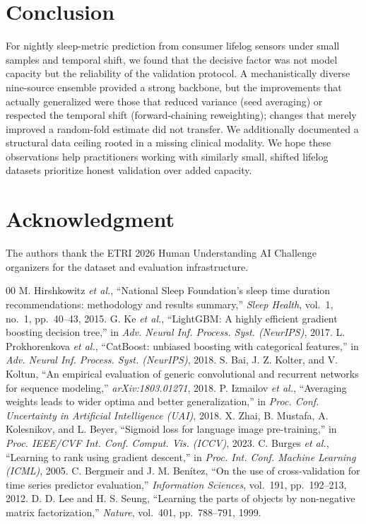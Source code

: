 \documentclass[conference]{IEEEtran}
\begin{document}
\section{Conclusion}
\label{sec:conc}
For nightly sleep-metric prediction from consumer lifelog sensors under small samples
and temporal shift, we found that the decisive factor was not model capacity but the
reliability of the validation protocol. A mechanistically diverse nine-source ensemble
provided a strong backbone, but the improvements that actually generalized were those
that reduced variance (seed averaging) or respected the temporal shift
(forward-chaining reweighting); changes that merely improved a random-fold estimate
did not transfer. We additionally documented a structural data ceiling rooted in a
missing clinical modality. We hope these observations help practitioners working with
similarly small, shifted lifelog datasets prioritize honest validation over added
capacity.

\section*{Acknowledgment}
The authors thank the ETRI 2026 Human Understanding AI Challenge organizers for the
dataset and evaluation infrastructure.

\begin{thebibliography}{00}
 M. Hirshkowitz \emph{et al.}, ``National Sleep Foundation's sleep time
duration recommendations: methodology and results summary,'' \emph{Sleep Health},
vol.~1, no.~1, pp.~40--43, 2015.
 G. Ke \emph{et al.}, ``LightGBM: A highly efficient gradient
boosting decision tree,'' in \emph{Adv. Neural Inf. Process. Syst. (NeurIPS)}, 2017.
 L. Prokhorenkova \emph{et al.}, ``CatBoost: unbiased boosting with
categorical features,'' in \emph{Adv. Neural Inf. Process. Syst. (NeurIPS)}, 2018.
 S. Bai, J. Z. Kolter, and V. Koltun, ``An empirical evaluation of
generic convolutional and recurrent networks for sequence modeling,''
\emph{arXiv:1803.01271}, 2018.
 P. Izmailov \emph{et al.}, ``Averaging weights leads to wider optima and
better generalization,'' in \emph{Proc. Conf. Uncertainty in Artificial Intelligence
(UAI)}, 2018.
 X. Zhai, B. Mustafa, A. Kolesnikov, and L. Beyer, ``Sigmoid loss for
language image pre-training,'' in \emph{Proc. IEEE/CVF Int. Conf. Comput. Vis.
(ICCV)}, 2023.
 C. Burges \emph{et al.}, ``Learning to rank using gradient
descent,'' in \emph{Proc. Int. Conf. Machine Learning (ICML)}, 2005.
 C. Bergmeir and J. M. Ben\'itez, ``On the use of cross-validation
for time series predictor evaluation,'' \emph{Information Sciences}, vol.~191,
pp.~192--213, 2012.
 D. D. Lee and H. S. Seung, ``Learning the parts of objects by
non-negative matrix factorization,'' \emph{Nature}, vol.~401, pp.~788--791, 1999.
\end{thebibliography}
\end{document}
